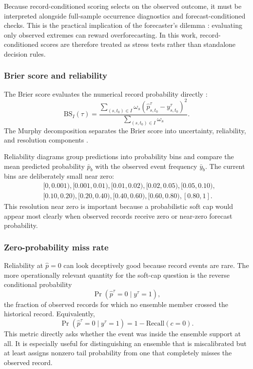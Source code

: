 \documentclass[11pt]{article}
\begin{document}
Because record-conditioned scoring selects on the observed outcome, it must be interpreted alongside full-sample occurrence diagnostics and forecast-conditioned checks. This is the practical implication of the forecaster's dilemma \citep{holzmann2014information,lerch2017forecasters}: evaluating only observed extremes can reward overforecasting. In this work, record-conditioned scores are therefore treated as stress tests rather than standalone decision rules.

\subsubsection{Brier score and reliability}

The Brier score evaluates the numerical record probability directly \citep{brier1950verification}:
\begin{equation}
    \mathrm{BS}_I(\tau)=
    \frac{\sum_{(s,t_0)\in I}\omega_s\left(\hat{p}^{\tau}_{s,t_0}-y^{\tau}_{s,t_0}\right)^2}
    {\sum_{(s,t_0)\in I}\omega_s}.
    \label{eq:brier}
\end{equation}
The Murphy decomposition separates the Brier score into uncertainty, reliability, and resolution components \citep{murphy1973partition}.

Reliability diagrams group predictions into probability bins and compare the mean predicted probability $\bar{p}_b$ with the observed event frequency $\bar{y}_b$. The current bins are deliberately small near zero:
\begin{align}
    &[0,0.001), [0.001,0.01), [0.01,0.02), [0.02,0.05), [0.05,0.10), \\
    &[0.10,0.20), [0.20,0.40), [0.40,0.60), [0.60,0.80), [0.80,1].
\end{align}
This resolution near zero is important because a probabilistic soft cap would appear most clearly when observed records receive zero or near-zero forecast probability.

\subsubsection{Zero-probability miss rate}

Reliability at $\hat{p}=0$ can look deceptively good because record events are rare. The more operationally relevant quantity for the soft-cap question is the reverse conditional probability
\begin{equation}
    \Pr(\hat{p}^{\tau}=0 \mid y^{\tau}=1),
    \label{eq:zeromiss}
\end{equation}
the fraction of observed records for which no ensemble member crossed the historical record. Equivalently,
\begin{equation}
    \Pr(\hat{p}^{\tau}=0 \mid y^{\tau}=1)=1-\mathrm{Recall}(c=0).
\end{equation}
This metric directly asks whether the event was inside the ensemble support at all. It is especially useful for distinguishing an ensemble that is miscalibrated but at least assigns nonzero tail probability from one that completely misses the observed record.
\end{document}
